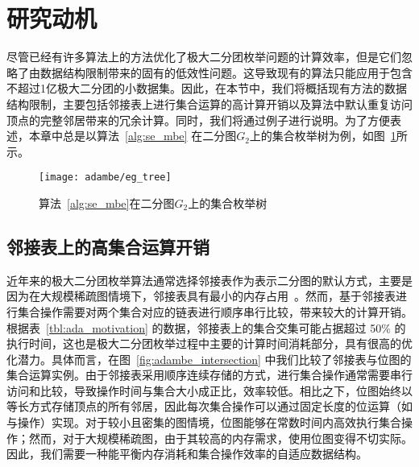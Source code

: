 \section{研究动机}

尽管已经有许多算法上的方法优化了极大二分团枚举问题的计算效率，但是它们忽略了由数据结构限制带来的固有的低效性问题。这导致现有的算法只能应用于包含不超过1亿极大二分团的小数据集。因此，在本节中，我们将概括现有方法的数据结构限制，主要包括邻接表上进行集合运算的高计算开销以及算法中默认重复访问顶点的完整邻居带来的冗余计算。同时，我们将通过例子进行说明。为了方便表述，本章中总是以算法~\ref{alg:se_mbe} 在二分图$G_2$上的集合枚举树为例，如图~\ref{fig:ada_tree}所示。

\begin{figure} [t]
	\centering
	\texttt{[image: adambe/eg\_tree]}
  \vspace{0.05in}
	\caption{算法~\ref{alg:se_mbe}在二分图$G_2$上的集合枚举树}

	\label{fig:ada_tree}
\end{figure}

\subsection{邻接表上的高集合运算开销}

近年来的极大二分团枚举算法通常选择邻接表作为表示二分图的默认方式，主要是因为在大规模稀疏图情境下，邻接表具有最小的内存占用~\cite{PMBE20,ooMBE22}。然而，基于邻接表进行集合操作需要对两个集合对应的链表进行顺序串行比较，带来较大的计算开销。根据表~\ref{tbl:ada_motivation} 的数据，邻接表上的集合交集可能占据超过 50\% 的执行时间，这也是极大二分团枚举过程中主要的计算时间消耗部分，具有很高的优化潜力。具体而言，在图~\ref{fig:adambe_intersection} 中我们比较了邻接表与位图的集合运算实例。由于邻接表采用顺序连续存储的方式，进行集合操作通常需要串行访问和比较，导致操作时间与集合大小成正比，效率较低。相比之下，位图始终以等长方式存储顶点的所有邻居，因此每次集合操作可以通过固定长度的位运算（如与操作）实现。对于较小且密集的图情境，位图能够在常数时间内高效执行集合操作；然而，对于大规模稀疏图，由于其较高的内存需求，使用位图变得不切实际。因此，我们需要一种能平衡内存消耗和集合操作效率的自适应数据结构。


